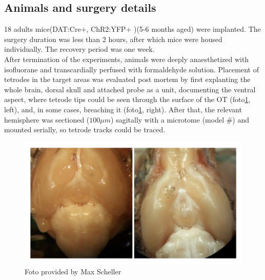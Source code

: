 \subsection{Animals and surgery details}
18 adults mice(DAT:Cre$+$, ChR2:YFP$+$ )(5-6 months aged) were implanted. The surgery duration was less than 2 hours, after which mice were housed individually. The recovery period was one week.\\
After termination of the experiments, animals were deeply anaesthetized with isofluorane and transcardially perfused with%
formaldehyde solution. Placement of tetrodes in the target areas was evaluated post mortem by first explanting the whole brain, dorsal skull and attached probe as a unit, documenting the ventral aspect, where tetrode tips could be seen through the surface of the OT (foto\ref{fig:surgery}, left), and, in some cases, breaching it (foto\ref{fig:surgery}, right). After that, the relevant hemisphere was sectioned ($100 \mu m$) sagitally with a microtome (model \#) and mounted serially, so tetrode tracks could be traced.
\begin{figure}[h!]
    \centering
    \includegraphics[scale=0.2]{figures/surgery_3.jpg}
    \caption{Foto provided by Max Scheller}
    \label{fig:surgery}
\end{figure}
